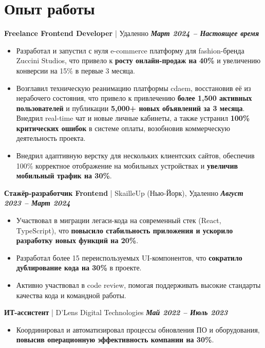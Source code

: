 \documentclass[a4paper,10pt]{article}
\newcommand{\entry}[3]{%
  \noindent\textbf{#1} | #2 \hfill \textbf{\textit{#3}} \par
}
\begin{document}
\section*{Опыт работы}
\entry{Freelance Frontend Developer}{Удаленно}{Март 2024 – Настоящее время}
\begin{itemize}[leftmargin=*, topsep=0.5ex, itemsep=0.2ex]
    \item Разработал и запустил с нуля e-commerce платформу для fashion-бренда Zuccini Studios, что привело к \textbf{росту онлайн-продаж на 40\%} и увеличению конверсии на 15\% в первые 3 месяца.
    \item Возглавил техническую реанимацию платформы cdaem, восстановив её из нерабочего состояния, что привело к привлечению \textbf{более 1,500 активных пользователей} и публикации \textbf{5,000+ новых объявлений за 3 месяца}. Внедрил real-time чат и новые личные кабинеты, а также устранил \textbf{100\% критических ошибок} в системе оплаты, возобновив коммерческую деятельность проекта.
    \item Внедрил адаптивную верстку для нескольких клиентских сайтов, обеспечив 100\% корректное отображение на мобильных устройствах и \textbf{увеличив мобильный трафик на 30\%}.
\end{itemize}
\vspace{1ex}

\entry{Стажёр-разработчик Frontend}{SkailleUp (Нью-Йорк), Удаленно}{Август 2023 – Март 2024}
\begin{itemize}[leftmargin=*, topsep=0.5ex, itemsep=0.2ex]
    \item Участвовал в миграции легаси-кода на современный стек (React, TypeScript), что \textbf{повысило стабильность приложения и ускорило разработку новых функций на 20\%}.
    \item Разработал более 15 переиспользуемых UI-компонентов, что \textbf{сократило дублирование кода на 30\%} в проекте.
    \item Активно участвовал в code review, помогая поддерживать высокие стандарты качества кода и командной работы.
\end{itemize}
\vspace{1ex}

\entry{ИТ-ассистент}{D’Lens Digital Technologies}{Май 2022 – Июль 2023}
\begin{itemize}[leftmargin=*, topsep=0.5ex, itemsep=0.2ex]
    \item Координировал и автоматизировал процессы обновления ПО и оборудования, \textbf{повысив операционную эффективность компании на 30\%}.
\end{itemize}
\end{document}
